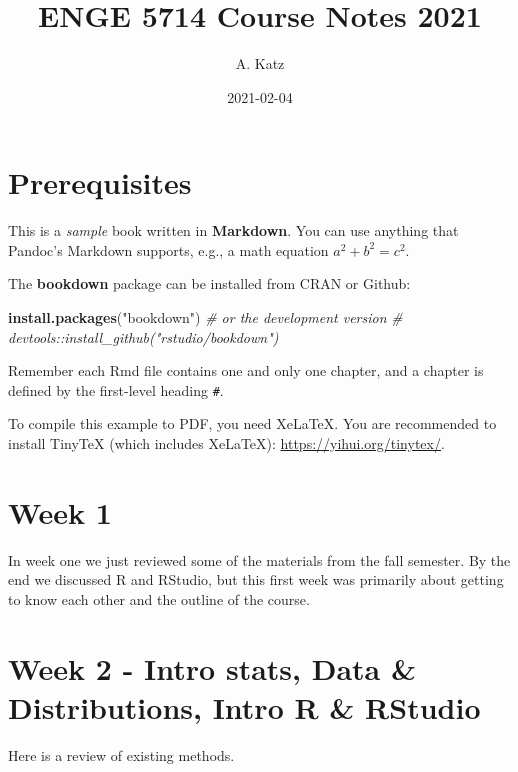 \documentclass[
]{book}
\title{ENGE 5714 Course Notes 2021}
\author{A. Katz}
\date{2021-02-04}
\newenvironment{Shaded}{\begin{snugshade}}{\end{snugshade}}
\newcommand{\CommentTok}[1]{\textcolor[rgb]{0.56,0.35,0.01}{\textit{#1}}}
\newcommand{\KeywordTok}[1]{\textcolor[rgb]{0.13,0.29,0.53}{\textbf{#1}}}
\newcommand{\NormalTok}[1]{#1}
\newcommand{\StringTok}[1]{\textcolor[rgb]{0.31,0.60,0.02}{#1}}
\begin{document}
\maketitle

{
\setcounter{tocdepth}{1}
\tableofcontents
}
\hypertarget{prerequisites}{%
\chapter{Prerequisites}\label{prerequisites}}

This is a \emph{sample} book written in \textbf{Markdown}. You can use anything that Pandoc's Markdown supports, e.g., a math equation \(a^2 + b^2 = c^2\).

The \textbf{bookdown} package can be installed from CRAN or Github:

\begin{Shaded}
\begin{Highlighting}[]
\KeywordTok{install.packages}\NormalTok{(}\StringTok{"bookdown"}\NormalTok{)}
\CommentTok{\# or the development version}
\CommentTok{\# devtools::install\_github("rstudio/bookdown")}
\end{Highlighting}
\end{Shaded}

Remember each Rmd file contains one and only one chapter, and a chapter is defined by the first-level heading \texttt{\#}.

To compile this example to PDF, you need XeLaTeX. You are recommended to install TinyTeX (which includes XeLaTeX): \url{https://yihui.org/tinytex/}.

\hypertarget{intro}{%
\chapter{Week 1}\label{intro}}

In week one we just reviewed some of the materials from the fall semester. By the end we discussed R and RStudio, but this first week was primarily about getting to know each other and the outline of the course.

\hypertarget{week-2---intro-stats-data-distributions-intro-r-rstudio}{%
\chapter{Week 2 - Intro stats, Data \& Distributions, Intro R \& RStudio}\label{week-2---intro-stats-data-distributions-intro-r-rstudio}}

Here is a review of existing methods.
\end{document}
